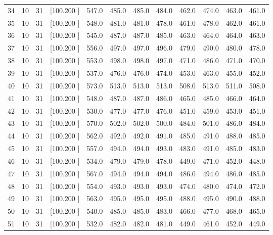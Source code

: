 \documentclass[12pt,a4paper]{article}
\begin{document}
\begin{center}
{\begin{tabular}{r r r r r r r r r r r r}
  34& 10& 31&[100.200   ]&   547.0&   485.0&   485.0&   484.0&   462.0&   474.0&   463.0&   461.0\\[-0.02in]
  35& 10& 31&[100.200   ]&   548.0&   481.0&   481.0&   478.0&   461.0&   478.0&   462.0&   461.0\\[-0.02in]
  36& 10& 31&[100.200   ]&   545.0&   487.0&   487.0&   485.0&   463.0&   464.0&   464.0&   463.0\\[-0.02in]
  37& 10& 31&[100.200   ]&   556.0&   497.0&   497.0&   496.0&   479.0&   490.0&   480.0&   478.0\\[-0.02in]
  38& 10& 31&[100.200   ]&   553.0&   498.0&   498.0&   497.0&   471.0&   486.0&   471.0&   470.0\\[-0.02in]
  39& 10& 31&[100.200   ]&   537.0&   476.0&   476.0&   474.0&   453.0&   463.0&   455.0&   452.0\\[-0.02in]
  40& 10& 31&[100.200   ]&   573.0&   513.0&   513.0&   513.0&   508.0&   513.0&   511.0&   508.0\\[-0.02in]
  41& 10& 31&[100.200   ]&   548.0&   487.0&   487.0&   486.0&   465.0&   485.0&   466.0&   464.0\\[-0.02in]
  42& 10& 31&[100.200   ]&   530.0&   477.0&   477.0&   476.0&   451.0&   459.0&   453.0&   451.0\\[-0.02in]
  43& 10& 31&[100.200   ]&   570.0&   502.0&   502.0&   500.0&   484.0&   501.0&   486.0&   484.0\\[-0.02in]
  44& 10& 31&[100.200   ]&   562.0&   492.0&   492.0&   491.0&   485.0&   491.0&   488.0&   485.0\\[-0.02in]
  45& 10& 31&[100.200   ]&   557.0&   494.0&   494.0&   493.0&   483.0&   491.0&   485.0&   483.0\\[-0.02in]
  46& 10& 31&[100.200   ]&   534.0&   479.0&   479.0&   478.0&   449.0&   471.0&   452.0&   448.0\\[-0.02in]
  47& 10& 31&[100.200   ]&   567.0&   494.0&   494.0&   494.0&   486.0&   494.0&   486.0&   485.0\\[-0.02in]
  48& 10& 31&[100.200   ]&   554.0&   493.0&   493.0&   493.0&   474.0&   480.0&   474.0&   472.0\\[-0.02in]
  49& 10& 31&[100.200   ]&   563.0&   495.0&   495.0&   495.0&   488.0&   495.0&   490.0&   488.0\\[-0.02in]
  50& 10& 31&[100.200   ]&   540.0&   485.0&   485.0&   483.0&   466.0&   477.0&   468.0&   465.0\\[-0.02in]
  51& 10& 31&[100.200   ]&   532.0&   482.0&   482.0&   481.0&   449.0&   461.0&   452.0&   449.0\\[-0.02in]

\end{tabular}}
\end{center}
\end{document}
